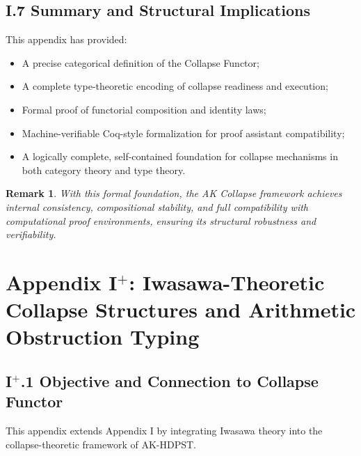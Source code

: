 \documentclass[11pt]{article}
\newtheorem{remark}[theorem]{Remark}
\begin{document}
\subsection*{I.7 Summary and Structural Implications}

This appendix has provided:

\begin{itemize}
    \item A precise categorical definition of the Collapse Functor;
    \item A complete type-theoretic encoding of collapse readiness and execution;
    \item Formal proof of functorial composition and identity laws;
    \item Machine-verifiable Coq-style formalization for proof assistant compatibility;
    \item A logically complete, self-contained foundation for collapse mechanisms in both category theory and type theory.
\end{itemize}

\begin{remark}
With this formal foundation, the AK Collapse framework achieves internal consistency, compositional stability, and full compatibility with computational proof environments, ensuring its structural robustness and verifiability.
\end{remark}




\section*{Appendix I$^{+}$: Iwasawa-Theoretic Collapse Structures and Arithmetic Obstruction Typing}

\subsection*{I$^{+}$.1 Objective and Connection to Collapse Functor}

This appendix extends Appendix I by integrating Iwasawa theory into the collapse-theoretic framework of AK-HDPST.
\end{document}
